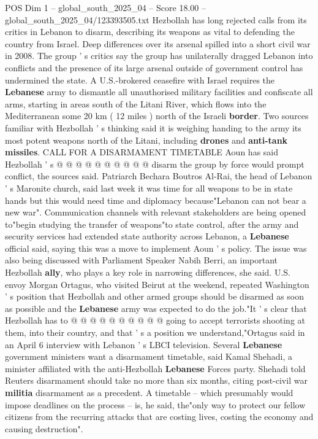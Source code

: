 \begin{textsample}{POS Dim 1 – global\_south\_2025\_04 – Score 18.00 – global\_south\_2025\_04/123393505.txt}
Hezbollah has long rejected calls from its critics in Lebanon to disarm, describing its weapons as vital to defending the country from Israel.
Deep differences over its arsenal spilled into a short civil war in 2008.
The group ' s critics say the group has unilaterally dragged Lebanon into conflicts and the presence of its large arsenal outside of government control has undermined the state.
A U.S.-brokered ceasefire with Israel requires the \textbf{Lebanese} army to dismantle all unauthorised military facilities and confiscate all arms, starting in areas south of the Litani River, which flows into the Mediterranean some 20 km ( 12 miles ) north of the Israeli \textbf{border}.
Two sources familiar with Hezbollah ' s thinking said it is weighing handing to the army its most potent weapons north of the Litani, including \textbf{drones} and \textbf{anti-tank} \textbf{missiles}.
CALL FOR A DISARMAMENT TIMETABLE Aoun has said Hezbollah ' s @ @ @ @ @ @ @ @ @ @ disarm the group by force would prompt conflict, the sources said.
Patriarch Bechara Boutros Al-Rai, the head of Lebanon ' s Maronite church, said last week it was time for all weapons to be in state hands but this would need time and diplomacy because"Lebanon can not bear a new war".
Communication channels with relevant stakeholders are being opened to"begin studying the transfer of weapons"to state control, after the army and security services had extended state authority across Lebanon, a \textbf{Lebanese} official said, saying this was a move to implement Aoun ' s policy.
The issue was also being discussed with Parliament Speaker Nabih Berri, an important Hezbollah \textbf{ally}, who plays a key role in narrowing differences, she said.
U.S. envoy Morgan Ortagus, who visited Beirut at the weekend, repeated Washington ' s position that Hezbollah and other armed groups should be disarmed as soon as possible and the \textbf{Lebanese} army was expected to do the job."It ' s clear that Hezbollah has to @ @ @ @ @ @ @ @ @ @ going to accept terrorists shooting at them, into their country, and that ' s a position we understand,"Ortagus said in an April 6 interview with Lebanon ' s LBCI television.
Several \textbf{Lebanese} government ministers want a disarmament timetable, said Kamal Shehadi, a minister affiliated with the anti-Hezbollah \textbf{Lebanese} Forces party.
Shehadi told Reuters disarmament should take no more than six months, citing post-civil war \textbf{militia} disarmament as a precedent.
A timetable -- which presumably would impose deadlines on the process -- is, he said, the"only way to protect our fellow citizens from the recurring attacks that are costing lives, costing the economy and causing destruction".

\end{textsample}
